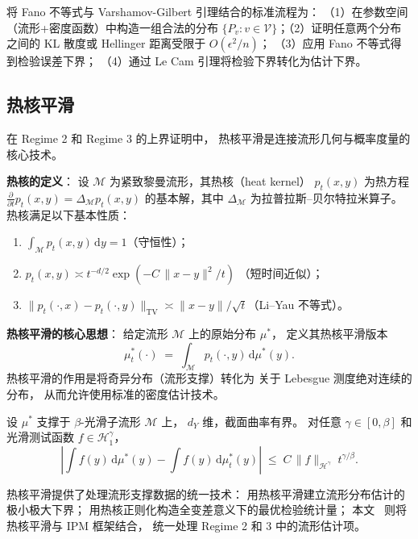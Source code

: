 将 Fano 不等式与 Varshamov-Gilbert 引理结合的标准流程为：
（1）在参数空间（流形+密度函数）中构造一组合法的分布
$\{P_v : v \in \mathcal{V}\}$；（2）证明任意两个分布之间的
KL 散度或 Hellinger 距离受限于 $O(\epsilon^2/n)$；
（3）应用 Fano 不等式得到检验误差下界；
（4）通过 Le Cam 引理将检验下界转化为估计下界。

\subsection{热核平滑}\label{sec:ch2-heat-kernel}

在 Regime 2 和 Regime 3 的上界证明中，
热核平滑是连接流形几何与概率度量的核心技术。

\textbf{热核的定义}：
设 $\mathcal{M}$ 为紧致黎曼流形，其热核（heat kernel）
$p_t(x, y)$ 为热方程
$\frac{\partial}{\partial t}p_t(x, y) = \Delta_{\mathcal{M}} p_t(x, y)$
的基本解，其中 $\Delta_{\mathcal{M}}$ 为拉普拉斯--贝尔特拉米算子。
热核满足以下基本性质：
\begin{enumerate}
    \item $\int_{\mathcal{M}} p_t(x, y)\,\mathrm{d}y = 1$（守恒性）；
    \item $p_t(x, y) \asymp t^{-d/2}\exp\!\left(-C\,\|x-y\|^2/t\right)$
          （短时间近似）；
    \item $\|p_t(\cdot, x) - p_t(\cdot, y)\|_{\mathrm{TV}}
          \asymp \|x-y\|/\sqrt{t}$（Li--Yau 不等式）。
\end{enumerate}

\textbf{热核平滑的核心思想}：
给定流形 $\mathcal{M}$ 上的原始分布 $\mu^*$，
定义其热核平滑版本
\[
    \mu^*_t(\cdot) \;=\; \int_{\mathcal{M}} p_t(\cdot, y)\,\mathrm{d}\mu^*(y).
\]
热核平滑的作用是将奇异分布（流形支撑）转化为
关于 Lebesgue 测度绝对连续的分布，
从而允许使用标准的密度估计技术。

\begin{Lemma}[热核平滑的逼近误差]\label{def:lem-heat-kernel}
    设 $\mu^*$ 支撑于 $\beta$-光滑子流形 $\mathcal{M}$ 上，
    $d_Y$ 维，截面曲率有界。
    对任意 $\gamma \in [0, \beta]$ 和光滑测试函数 $f \in \mathcal{H}_1^\gamma$，
    \[
        \left|\int f(y)\,\mathrm{d}\mu^*(y) - \int f(y)\,\mathrm{d}\mu^*_t(y)\right|
        \;\leq\;
        C\,\|f\|_{\mathcal{H}^\gamma}\;t^{\gamma/\beta}.
    \]
\end{Lemma}

\begin{Remark}\label{rem:heat-kernel}
    热核平滑提供了处理流形支撑数据的统一技术：
    \citep{tang2022minimax} 用热核平滑建立流形分布估计的极小极大下界；
    \citep{tang2023twosample} 用热核正则化构造全变差意义下的最优检验统计量；
    本文~\citep{tang2025regression} 则将热核平滑与 IPM 框架结合，
    统一处理 Regime 2 和 3 中的流形估计项。
\end{Remark}

